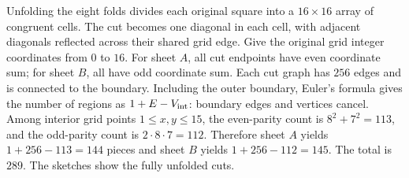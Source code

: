 Unfolding the eight folds divides each original square into a $16\times16$ array of congruent cells. The cut becomes one diagonal in each cell, with adjacent diagonals reflected across their shared grid edge. Give the original grid integer coordinates from $0$ to $16$. For sheet $A$, all cut endpoints have even coordinate sum; for sheet $B$, all have odd coordinate sum. Each cut graph has $256$ edges and is connected to the boundary. Including the outer boundary, Euler's formula gives the number of regions as $1+E-V_{\rm int}$: boundary edges and vertices cancel. Among interior grid points $1\le x,y\le15$, the even-parity count is $8^2+7^2=113$, and the odd-parity count is $2\cdot8\cdot7=112$. Therefore sheet $A$ yields $1+256-113=144$ pieces and sheet $B$ yields $1+256-112=145$. The total is $\boxed{289}$. The sketches show the fully unfolded cuts.
